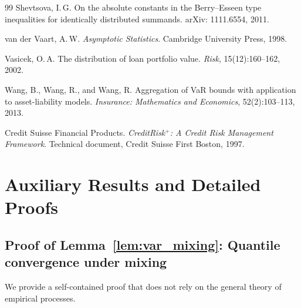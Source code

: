 \documentclass[11pt]{article}
\theoremstyle{definition}
\newcommand{\1}{\mathbf{1}}
\begin{document}
\begin{thebibliography}{99}
Shevtsova, I.\,G.
\newblock On the absolute constants in the Berry--Esseen type inequalities for identically distributed summands.
\newblock arXiv: 1111.6554, 2011.

van der Vaart, A.\,W.
\newblock \emph{Asymptotic Statistics}.
\newblock Cambridge University Press, 1998.

Vasicek, O.\,A.
\newblock The distribution of loan portfolio value.
\newblock \emph{Risk}, 15(12):160--162, 2002.

Wang, B., Wang, R., and Wang, R.
\newblock Aggregation of VaR bounds with application to asset-liability models.
\newblock \emph{Insurance: Mathematics and Economics}, 52(2):103--113, 2013.

Credit Suisse Financial Products.
\newblock \emph{CreditRisk$^+$: A Credit Risk Management Framework}.
\newblock Technical document, Credit Suisse First Boston, 1997.

\end{thebibliography}

\appendix

\section{Auxiliary Results and Detailed Proofs}\label{app:proofs}

\subsection{Proof of Lemma~\ref{lem:var_mixing}: Quantile convergence under mixing}\label{app:var_mixing}

We provide a self-contained proof that does not rely on the general theory of empirical processes.
\end{document}
